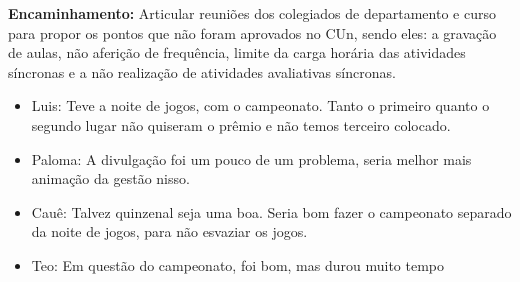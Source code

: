 \documentclass{ata-calico}
\begin{document}
\textbf{Encaminhamento:} Articular reuniões dos colegiados de departamento e curso para propor os pontos que não foram aprovados no CUn, sendo eles: a gravação de aulas, não aferição de frequência, limite da carga horária das atividades síncronas e a não realização de atividades avaliativas síncronas.

\begin{itemize}
\item Luis: Teve a noite de jogos, com o campeonato. Tanto o primeiro quanto o segundo lugar não quiseram o prêmio e não temos terceiro colocado.
\item Paloma: A divulgação foi um pouco de um problema, seria melhor mais animação da gestão nisso.
\item Cauê: Talvez quinzenal seja uma boa. Seria bom fazer o campeonato separado da noite de jogos, para não esvaziar os jogos.
\item Teo: Em questão do campeonato, foi bom, mas durou muito tempo
\end{itemize}

\end{document}
